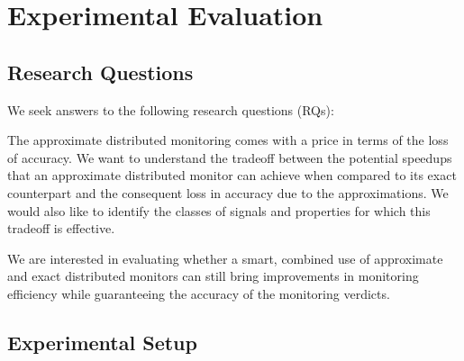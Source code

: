 \section{Experimental Evaluation} 
\label{sec:experiments}


\subsection{Research Questions}

We seek answers to the following research questions (RQs):
\begin{resq}
The approximate distributed monitoring comes with a price in terms of the loss of accuracy.
We want to understand the tradeoff between the potential speedups that an approximate distributed monitor can achieve when compared to its exact counterpart and the consequent loss in accuracy due to the approximations.
We would also like to identify the classes of signals and properties for which this tradeoff is effective. 
\end{resq}
\begin{resq}
We are interested in evaluating whether a smart, combined use of approximate and exact distributed monitors can still bring improvements in monitoring efficiency while guaranteeing the accuracy of the monitoring verdicts. 
\end{resq}


\subsection{Experimental Setup}

